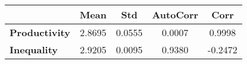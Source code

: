 \begin{tiny}\begin{tabular}{|l|c|c|c|c|}
\hline
&\textbf{Mean}&\textbf{Std}&\textbf{AutoCorr}&\textbf{Corr}\\\hline
\textbf{Productivity}&2.8695&0.0555&0.0007&0.9998\\\hline
\textbf{Inequality}&2.9205&0.0095&0.9380&-0.2472\\\hline
\end{tabular}
\end{tiny}